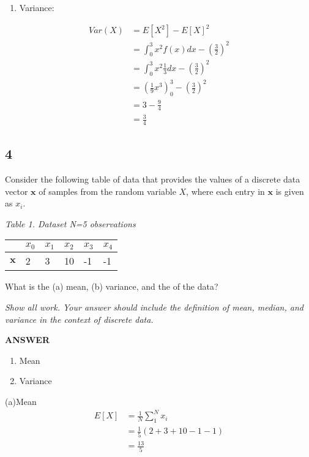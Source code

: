 \documentclass[11pt]{article}
\providecommand{\tightlist}{%
      \setlength{\itemsep}{0pt}\setlength{\parskip}{0pt}}
\begin{document}
\begin{enumerate}
\def\labelenumi{(\alph{enumi})}
\setcounter{enumi}{1}
\tightlist
\item
  Variance:
\end{enumerate}

\[
\begin{align}
Var(X)&=E[X^2]-E[X]^2 \\
      &=\int_{0}^{3} x^2 f(x) dx - (\frac{3}{2})^2\\
      &=\int_{0}^{3} x^2 \frac{1}{3} dx - (\frac{3}{2})^2\\
      &=(\frac{1}{9} x^3)_{0}^{3}- (\frac{3}{2})^2\\
      &=3-\frac{9}{4}\\
      &=\frac{3}{4}
\end{align}
\]

    \subsection{4}\label{section}

Consider the following table of data that provides the values of a
discrete data vector \(\mathbf{x}\) of samples from the random variable
\(X\), where each entry in \(\mathbf{x}\) is given as \(x_i\).

\emph{Table 1. Dataset N=5 observations}

\begin{longtable}[]{@{}llllll@{}}
\toprule
& \(x_0\) & \(x_1\) & \(x_2\) & \(x_3\) & \(x_4\)\tabularnewline
\midrule
\endhead
\(\textbf{x}\) & 2 & 3 & 10 & -1 & -1\tabularnewline
\bottomrule
\end{longtable}

What is the (a) mean, (b) variance, and the of the data?

\emph{Show all work. Your answer should include the definition of mean,
median, and variance in the context of discrete data.}

    \textbf{ANSWER}

\begin{enumerate}
\def\labelenumi{(\alph{enumi})}
\item
  Mean
\item
  Variance
\end{enumerate}

    (a)Mean \[
\begin{align}
E[X] &= \frac{1}{N}\sum_{1}^{N}x_{i} \\
     &=\frac{1}{5}(2+3+10-1-1) \\
     &=\frac{13}{5}
\end{align}
\]
\end{document}
